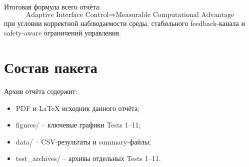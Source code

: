 \documentclass[12pt,a4paper]{article}
\begin{document}
Итоговая формула всего отчёта:
\[
\boxed{
\text{Adaptive Interface Control}
\Rightarrow
\text{Measurable Computational Advantage}
}
\]
при условии корректной наблюдаемости среды, стабильного feedback-канала и safety-aware ограничений управления.

\appendix
\section{Состав пакета}

Архив отчёта содержит:
\begin{itemize}
\item PDF и LaTeX исходник данного отчёта;
\item figures/ -- ключевые графики Tests 1--11;
\item data/ -- CSV-результаты и summary-файлы;
\item test\_archives/ -- архивы отдельных Tests 1--11.
\end{itemize}
\end{document}
